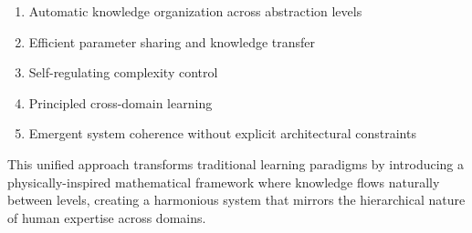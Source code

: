 \begin{enumerate}
    \item Automatic knowledge organization across abstraction levels
    \item Efficient parameter sharing and knowledge transfer
    \item Self-regulating complexity control
    \item Principled cross-domain learning
    \item Emergent system coherence without explicit architectural constraints
\end{enumerate}

This unified approach transforms traditional learning paradigms by introducing a physically-inspired mathematical framework where knowledge flows naturally between levels, creating a harmonious system that mirrors the hierarchical nature of human expertise across domains.